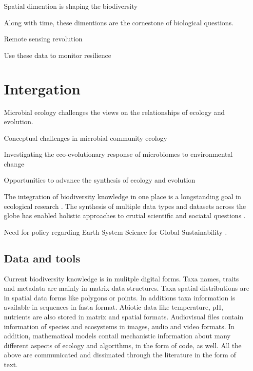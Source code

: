 Spatial dimention is shaping the biodiversity

Along with time, these dimentions are the cornestone of 
biological questions. 


Remote sensing revolution

Use these data to monitor resilience \cite{Lenton2022resilience}

\section{Intergation}
\label{sec:crete-integration}

Microbial ecology challenges the views on the relationships of ecology and evolution.

Conceptual challenges in microbial community ecology \cite{prosser2020Conceptual}

Investigating the eco-evolutionary response of microbiomes to environmental change \cite{martiny2023Investigating}

Opportunities to advance the synthesis of ecology and evolution \cite{loreau2023Opportunities}


The integration of biodiversity knowledge in one place is a longstanding
goal in ecological research \cite{Walter_2012}. The synthesis of multiple
data types and datasets across the globe has enabled 
holistic approaches to crutial scientific and sociatal questions \cite{heberling_j_mason_data_2021}.

Need for policy regarding Earth System Science for Global
Sustainability \cite{reid2010earth}.

\subsection{Data and tools}
\label{sec:data-tools}

Current biodiversity knowledge is in mulitple digital forms. 
Taxa names, traits and metadata are mainly in matrix data
structures. Taxa spatial distributions are in spatial data
forms like polygons or points. In additions taxa information
is available in sequences in fasta format. Abiotic data like 
temperature, pH, nutrients are also stored in matrix
and spatial formats. Audiovisual files contain information
of species and ecosystems in images, audio and video formats.
In addition, mathematical models contail mechanistic information
about many different aspects of ecology and algorithms, in the 
form of code, as well. All the above are communicated and dissimated through the
literature in the form of text.

